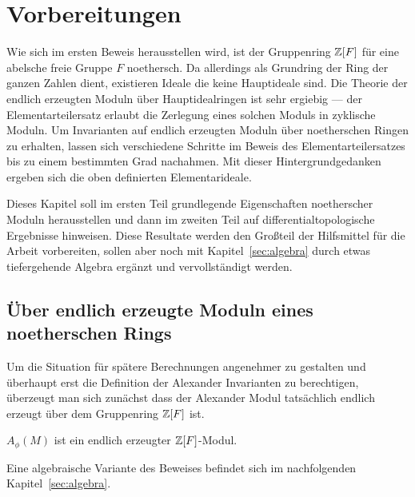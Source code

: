 
\section{Vorbereitungen}
\label{sec:vorbereitungen}

Wie sich im ersten Beweis herausstellen wird, ist der Gruppenring $\mathbb{Z}[F]$ für eine abelsche freie Gruppe $F$ noethersch. Da allerdings als Grundring der Ring der ganzen Zahlen dient, existieren Ideale die keine Hauptideale sind. Die Theorie der endlich erzeugten Moduln über Hauptidealringen ist sehr ergiebig --- der Elementarteilersatz erlaubt die Zerlegung eines solchen Moduls in zyklische Moduln. Um Invarianten auf endlich erzeugten Moduln über noetherschen Ringen zu erhalten, lassen sich verschiedene Schritte im Beweis des Elementarteilersatzes bis zu einem bestimmten Grad nachahmen. Mit dieser Hintergrundgedanken ergeben sich die oben definierten Elementarideale. 

Dieses Kapitel soll im ersten Teil grundlegende Eigenschaften noetherscher Moduln herausstellen und dann im zweiten Teil auf differentialtopologische Ergebnisse hinweisen. Diese Resultate werden den Großteil der Hilfsmittel für die Arbeit vorbereiten, sollen aber noch mit Kapitel~\ref{sec:algebra} durch etwas tiefergehende Algebra ergänzt und vervollständigt werden.

\subsection{Über endlich erzeugte Moduln eines noetherschen Rings}

Um die Situation für spätere Berechnungen angenehmer zu gestalten und überhaupt erst die Definition der Alexander Invarianten zu berechtigen, überzeugt man sich zunächst dass der Alexander Modul tatsächlich endlich erzeugt über dem Gruppenring $\mathbb{Z}[F]$ ist. 

\begin{prop}
\label{prop:alexendlerz}
		$A_\phi(M)$ ist ein endlich erzeugter $\mathbb{Z}[F]$-Modul.
\end{prop}
\begin{bem}\label{rem:AlexModulendlerz}
	Eine algebraische Variante des Beweises befindet sich im nachfolgenden Kapitel~\ref{sec:algebra}. 
\end{bem}

